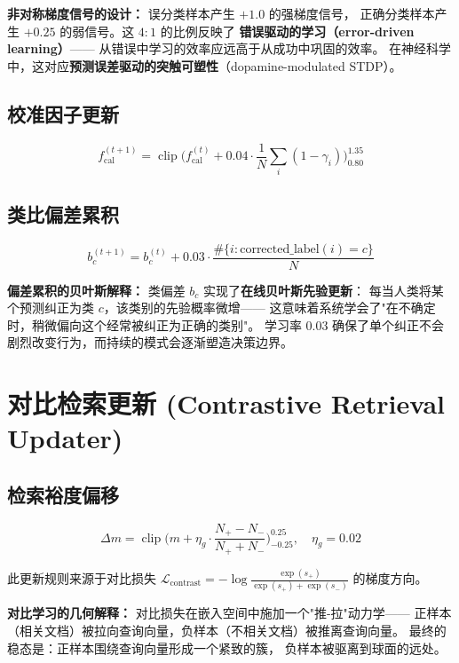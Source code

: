 \documentclass[11pt,a4paper]{ctexart}
\theoremstyle{remark}
\DeclareMathOperator{\clip}{clip}
\begin{document}
\textbf{非对称梯度信号的设计：} 误分类样本产生 $+1.0$ 的强梯度信号，
正确分类样本产生 $+0.25$ 的弱信号。这 $4:1$ 的比例反映了
\textbf{错误驱动的学习（error-driven learning）}——
从错误中学习的效率应远高于从成功中巩固的效率。
在神经科学中，这对应\textbf{预测误差驱动的突触可塑性}（dopamine-modulated STDP）。

\subsection{校准因子更新}

\begin{equation}
f_{\text{cal}}^{(t+1)} = \clip\Big(f_{\text{cal}}^{(t)} + 0.04 \cdot \frac{1}{N}\sum_i(1 - \gamma_i)\Big)_{0.80}^{1.35}
\end{equation}

\subsection{类比偏差累积}

\begin{equation}
b_c^{(t+1)} = b_c^{(t)} + 0.03 \cdot \frac{\#\{i: \text{corrected\_label}(i) = c\}}{N}
\end{equation}

\textbf{偏差累积的贝叶斯解释：} 类偏差 $b_c$ 实现了\textbf{在线贝叶斯先验更新}：
每当人类将某个预测纠正为类 $c$，该类别的先验概率微增——
这意味着系统学会了"在不确定时，稍微偏向这个经常被纠正为正确的类别"。
学习率 0.03 确保了单个纠正不会剧烈改变行为，而持续的模式会逐渐塑造决策边界。

\section{对比检索更新 (Contrastive Retrieval Updater)}

\subsection{检索裕度偏移}

\begin{equation}
\Delta m = \clip\Big(m + \eta_g \cdot \frac{N_+ - N_-}{N_+ + N_-}\Big)_{-0.25}^{0.25}, \quad \eta_g = 0.02
\end{equation}

此更新规则来源于对比损失 $\mathcal{L}_{\text{contrast}} = -\log\frac{\exp(s_+)}{\exp(s_+) + \exp(s_-)}$ 的梯度方向。

\textbf{对比学习的几何解释：} 对比损失在嵌入空间中施加一个"推-拉"动力学——
正样本（相关文档）被拉向查询向量，负样本（不相关文档）被推离查询向量。
最终的稳态是：正样本围绕查询向量形成一个紧致的簇，
负样本被驱离到球面的远处。
\end{document}
